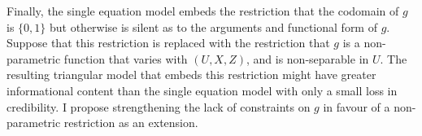 \documentclass[10pt,a4paper,twoside]{article}
\numberwithin{equation}{section}
\begin{document}
Finally, the single equation model embeds the restriction that the codomain of $g$ is $\lbrace 0,1\rbrace$ but otherwise is silent as to the arguments and functional form of $g$. Suppose that this restriction is replaced with the restriction that $g$ is a non-parametric function that varies with $(U,X,Z)$, and is non-separable in $U$. The resulting triangular model that embeds this restriction might have greater informational content than the single equation model with only a small loss in credibility. I propose strengthening the lack of constraints on $g$ in favour of a non-parametric restriction as an extension.
%
\end{document}
